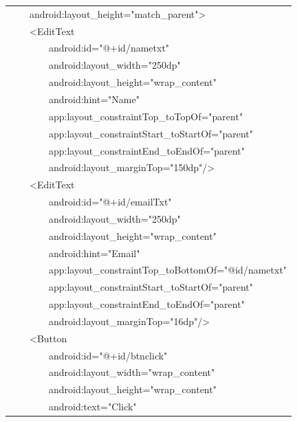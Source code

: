 \documentclass[a4paper,12pt]{article}
\begin{document}
\begin{longtable}{|p{}|}
{\ttfamily\small \ \ \ \ android:layout\_height="match\_parent"\textgreater{}} \\
{\ttfamily\small \ \ \ \ \textless{}EditText} \\
{\ttfamily\small \ \ \ \ \ \ \ \ android:id="@+id/nametxt"} \\
{\ttfamily\small \ \ \ \ \ \ \ \ android:layout\_width="250dp"} \\
{\ttfamily\small \ \ \ \ \ \ \ \ android:layout\_height="wrap\_content"} \\
{\ttfamily\small \ \ \ \ \ \ \ \ android:hint="Name"} \\
{\ttfamily\small \ \ \ \ \ \ \ \ app:layout\_constraintTop\_toTopOf="parent"} \\
{\ttfamily\small \ \ \ \ \ \ \ \ app:layout\_constraintStart\_toStartOf="parent"} \\
{\ttfamily\small \ \ \ \ \ \ \ \ app:layout\_constraintEnd\_toEndOf="parent"} \\
{\ttfamily\small \ \ \ \ \ \ \ \ android:layout\_marginTop="150dp"/\textgreater{}} \\
{\ttfamily\small \ \ \ \ \textless{}EditText} \\
{\ttfamily\small \ \ \ \ \ \ \ \ android:id="@+id/emailTxt"} \\
{\ttfamily\small \ \ \ \ \ \ \ \ android:layout\_width="250dp"} \\
{\ttfamily\small \ \ \ \ \ \ \ \ android:layout\_height="wrap\_content"} \\
{\ttfamily\small \ \ \ \ \ \ \ \ android:hint="Email"} \\
{\ttfamily\small \ \ \ \ \ \ \ \ app:layout\_constraintTop\_toBottomOf="@id/nametxt"} \\
{\ttfamily\small \ \ \ \ \ \ \ \ app:layout\_constraintStart\_toStartOf="parent"} \\
{\ttfamily\small \ \ \ \ \ \ \ \ app:layout\_constraintEnd\_toEndOf="parent"} \\
{\ttfamily\small \ \ \ \ \ \ \ \ android:layout\_marginTop="16dp"/\textgreater{}} \\
{\ttfamily\small \ \ \ \ \textless{}Button} \\
{\ttfamily\small \ \ \ \ \ \ \ \ android:id="@+id/btnclick"} \\
{\ttfamily\small \ \ \ \ \ \ \ \ android:layout\_width="wrap\_content"} \\
{\ttfamily\small \ \ \ \ \ \ \ \ android:layout\_height="wrap\_content"} \\
{\ttfamily\small \ \ \ \ \ \ \ \ android:text="Click"} \\

\end{longtable}
\end{document}

